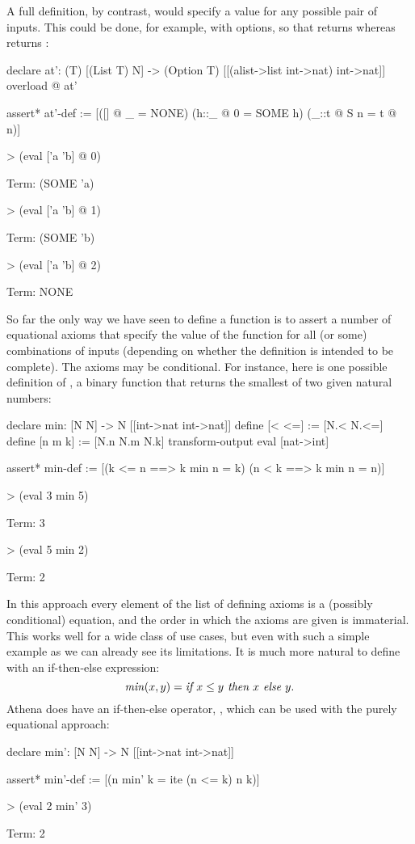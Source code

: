 A full definition, by contrast, would specify a value for any possible pair of inputs. This could be done, for example, with options,
so that  returns  whereas  returns :
\begin{tcAthena}
declare at': (T) [(List T) N] -> (Option T) [[(alist->list int->nat) int->nat]]
overload @ at'

assert* at'-def := [([] @ _ = NONE)
                    (h::_ @ 0 = SOME h)
                    (_::t @ S n = t @ n)]

> (eval ['a 'b] @ 0)

Term: (SOME 'a)

> (eval ['a 'b] @ 1)

Term: (SOME 'b)

> (eval ['a 'b] @ 2)

Term: NONE
\end{tcAthena}

So far the only way we have seen to define a function is to assert a number of equational axioms that
specify the value of the function for all (or some) combinations of inputs (depending on whether
the definition is intended to be complete). The axioms may be conditional. For instance, here is one
possible definition of , a binary function that returns the smallest of two given natural numbers:
\begin{tcAthena}
declare min: [N N] -> N [[int->nat int->nat]]
define [< <=] := [N.< N.<=]
define [n m k] := [N.n N.m N.k]
transform-output eval [nat->int]

assert* min-def := 
   [(k <= n ==> k min n = k)
    (n < k  ==> k min n = n)]

> (eval 3 min 5)

Term: 3

> (eval 5 min 2)

Term: 2
\end{tcAthena}
In this approach every element of the list of defining axioms is a (possibly conditional) equation, and the order
in which the axioms are given is immaterial. This works well for a wide class of use cases, but even with such
a simple example as  we can already see its limitations. It is much more natural to define  with
an if-then-else expression:
\[ \mbox{\em min\/}(x,y) = \mbox{\em if $x \leq y$ then $x$ else $y$\/}.\]
Athena does have an if-then-else operator, , which can be used with the purely equational approach: 
\begin{tcAthena}
declare min': [N N] -> N [[int->nat int->nat]]

assert* min'-def := [(n min' k = ite (n <= k) n k)]

> (eval 2 min' 3)

Term: 2
\end{tcAthena}

